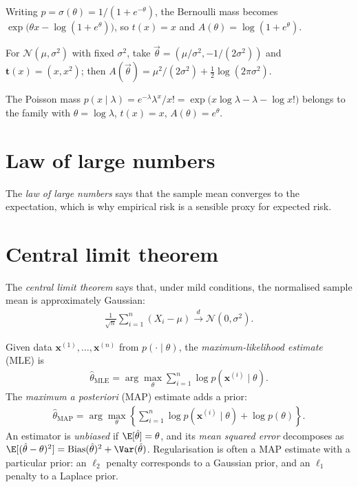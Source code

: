 \documentclass[a4paper, 12pt]{book}
\begin{document}
\begin{example}[Bernoulli]
    Writing $p=\sigma(\theta)=1/(1+e^{-\theta})$, the Bernoulli mass becomes $\exp\!\big(\theta x-\log(1+e^\theta)\big)$, so $t(x)=x$ and $A(\theta)=\log(1+e^\theta)$.
\end{example}

\begin{example}
    For $\mathscr{N}(\mu,\sigma^2)$ with fixed $\sigma^2$, take $\vec\theta=(\mu/\sigma^2,-1/(2\sigma^2))$ and $\mathbf t(x)=(x,x^2)$; then $A(\vec\theta)=\mu^2/(2\sigma^2)+\tfrac12\log(2\pi\sigma^2)$.
\end{example}

\begin{example}[Poisson]
    The Poisson mass $p(x\mid\lambda)=e^{-\lambda}\lambda^x/x!=\exp\!\big(x\log\lambda-\lambda-\log x!\big)$ belongs to the family with $\theta=\log\lambda$, $t(x)=x$, $A(\theta)=e^\theta$.
\end{example}

\section{Law of large numbers}

The \emph{law of large numbers} says that the sample mean converges to the expectation, which is why empirical risk is a sensible proxy for expected risk. 

\section{Central limit theorem}

\begin{proposition}
    The \emph{central limit theorem} says that, under mild conditions, the normalised sample mean is approximately Gaussian:
\begin{align}
    \frac{1}{\sqrt{n}}\sum_{i=1}^n (X_i - \mu)
    \xrightarrow{d} \mathscr{N}(0,\sigma^2).
\end{align}
\end{proposition}

Given data $\mathbf{x}^{(1)},\ldots,\mathbf{x}^{(n)}$ from $p(\cdot\mid\theta)$, the
\emph{maximum-likelihood estimate} (MLE) is
\begin{align}
    \hat{\theta}_{\mathrm{MLE}}
    = \arg\max_{\theta} \sum_{i=1}^n \log p(\mathbf{x}^{(i)}\mid\theta).
\end{align}
The \emph{maximum a posteriori} (MAP) estimate adds a prior:
\begin{align}
    \hat{\theta}_{\mathrm{MAP}}
    = \arg\max_{\theta} \left\{
    \sum_{i=1}^n \log p(\mathbf{x}^{(i)}\mid\theta) + \log p(\theta)
    \right\}.
\end{align}
An estimator is \emph{unbiased} if $\E[\hat{\theta}] = \theta$, and its
\emph{mean squared error} decomposes as
$\E[(\hat{\theta}-\theta)^2] = \mathrm{Bias}(\hat{\theta})^2 +
\Var(\hat{\theta})$. Regularisation is often a MAP estimate with a particular prior:
an $\ell_2$ penalty corresponds to a Gaussian prior, and an $\ell_1$ penalty to a
Laplace prior.
\end{document}
